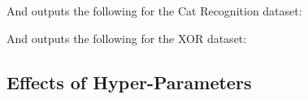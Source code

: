 \documentclass[./project-report/src/latex/project-report.tex]{subfiles}
\begin{document}
And outputs the following for the Cat Recognition dataset:

\pagebreak

\begin{figure}[h!]
\centering
{}
\end{figure}

And outputs the following for the XOR dataset:

\pagebreak

\begin{figure}[h!]
\centering
{}
\end{figure}

\subsection{Effects of Hyper-Parameters}
\label{sec:effects-of-hyper-parameters}
\end{document}
